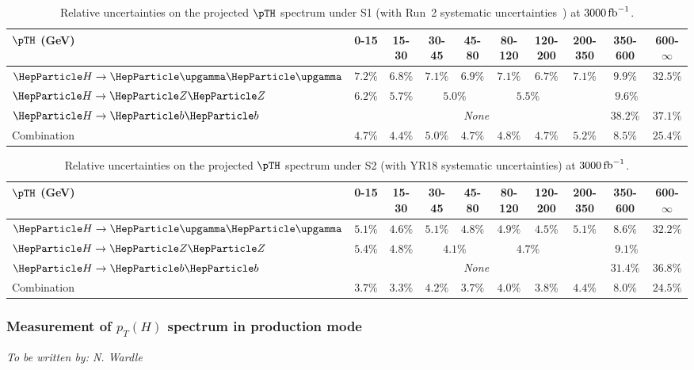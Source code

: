 \begin{table}[htbH]
\footnotesize
\begin{center}
\begin{tabular}{l|c|c|c|c|c|c|c|c|c}
$\pTH$ (GeV)       & 0-15    &  15-30   &  30-45    &  45-80   &  80-120  &  120-200  &  200-350  &  350-600  &  600-$\infty$  \\
\hline
$\hgg$       & $7.2\%$ & $6.8\%$ & $7.1\%$ & $6.9\%$            & $7.1\%$ & $6.7\%$            & $7.1\%$ & $9.9\%$  & $32.5\%$ \\ 
$\hzz$       & $6.2\%$ & $5.7\%$ & \multicolumn{2}{c|}{$5.0\%$} & \multicolumn{2}{c|}{$5.5\%$} & \multicolumn{3}{c}{$9.6\%$} \\ 
$\hbb$       & \multicolumn{7}{c|}{\textit{None}}                                              & $38.2\%$ & $37.1\%$ \\ 
Combination  & $4.7\%$ & $4.4\%$ & $5.0\%$ & $4.7\%$            & $4.8\%$ & $4.7\%$            & $5.2\%$ & $8.5\%$  & $25.4\%$ \\
\end{tabular}
\end{center}
\caption{
    Relative uncertainties on the projected $\pTH$ spectrum under S1 (with Run~2 systematic uncertainties~\cite{CMS-PAS-HIG-17-028}) at $3000\mbox{\ensuremath{\,\text{fb}^\text{$-$1}}}$.
    }
\label{tab:proj_pth_unc_scen1}
\end{table}

\begin{table}[htbH]
\footnotesize
\begin{center}
\begin{tabular}{l|c|c|c|c|c|c|c|c|c}
$\pTH$ (GeV)       & 0-15    &  15-30   &  30-45    &  45-80   &  80-120  &  120-200  &  200-350  &  350-600  &  600-$\infty$  \\
\hline
$\hgg$       & $5.1\%$ & $4.6\%$ & $5.1\%$ & $4.8\%$            & $4.9\%$ & $4.5\%$            & $5.1\%$ & $8.6\%$  & $32.2\%$ \\ 
$\hzz$       & $5.4\%$ & $4.8\%$ & \multicolumn{2}{c|}{$4.1\%$} & \multicolumn{2}{c|}{$4.7\%$} & \multicolumn{3}{c}{$9.1\%$} \\ 
$\hbb$       & \multicolumn{7}{c|}{\textit{None}}                                              & $31.4\%$ & $36.8\%$ \\ 
Combination  & $3.7\%$ & $3.3\%$ & $4.2\%$ & $3.7\%$            & $4.0\%$ & $3.8\%$            & $4.4\%$ & $8.0\%$  & $24.5\%$ \\
\end{tabular}
\end{center}
\caption{
    Relative uncertainties on the projected $\pTH$ spectrum under S2 (with YR18 systematic uncertainties) at $3000\mbox{\ensuremath{\,\text{fb}^\text{$-$1}}}$.
    }
\label{tab:proj_pth_unc_scen2}
\end{table}



\subsubsection{Measurement of $p_{T}(H)$ spectrum  in \ttH production mode}
\begin{center}{\it To be written by: N. Wardle} \end{center}

